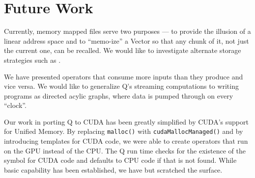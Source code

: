 \section{Future Work}

Currently, memory mapped files serve two purposes --- to provide the illusion of
a linear address space and to ``memo-ize'' a Vector so that any chunk of it, not
just the current one, can be recalled. We would like to investigate alternate
storage strategies such as \cite{ramcloud2009}.

We have presented operators that consume more inputs than they produce and vice
versa. We would like to generalize Q's streaming computations to writing
programs as directed acylic graphs, where data is
pumped through on every ``clock''.

Our work in porting Q to CUDA has been greatly simplified by CUDA's support for
Unified Memory. By replacing {\tt malloc()} with {\tt  cudaMallocManaged()} and
by introducing templates for CUDA code, we were able to create operators that
run on the GPU instead of the CPU. The Q run time checks for the existence of
the symbol for CUDA code and defaults to CPU code if that is not found. While
basic capability has been established, we have but scratched the surface.

